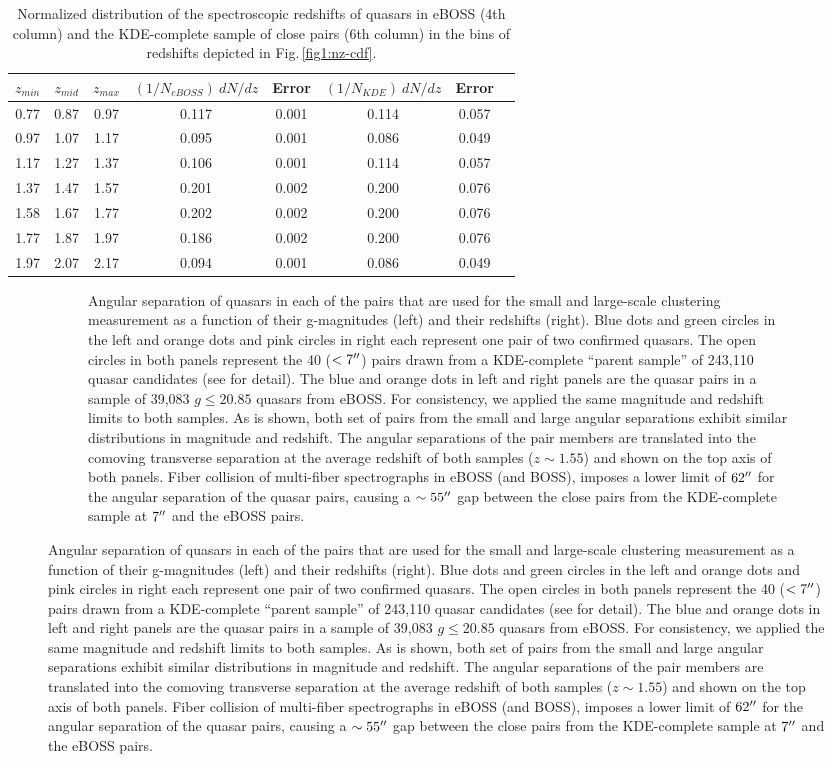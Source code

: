 \documentclass[useAMS,usenatbib]{mn2e}
\begin{document}
\begin{table}
\centering
\begin{tabular}{cccccccc}

\hline
\hline
$z_{min}$   &$z_{mid}$ &$z_{max}$& $(1/N_{eBOSS})~dN/dz$ & Error & $(1/N_{KDE})~dN/dz$& Error\\

\hline


0.77 & 0.87 & 0.97 & 0.117 & 0.001 & 0.114 & 0.057 \\
0.97 & 1.07 & 1.17 & 0.095 & 0.001 & 0.086 & 0.049 \\
1.17 & 1.27 & 1.37 & 0.106 & 0.001 & 0.114 & 0.057 \\
1.37 & 1.47 & 1.57 & 0.201 & 0.002 & 0.200 & 0.076 \\
1.58 & 1.67 & 1.77 & 0.202 & 0.002 & 0.200 & 0.076 \\
1.77 & 1.87 & 1.97 & 0.186 & 0.002 & 0.200 & 0.076 \\
1.97 & 2.07 & 2.17 & 0.094 & 0.001 & 0.086 & 0.049 \\

\hline
\end{tabular}
\caption{ Normalized distribution of the spectroscopic redshifts of quasars in eBOSS (4th column) and the KDE-complete sample of close pairs (6th column) in the bins of redshifts depicted in Fig.\,\ref{fig1:nz-cdf}.}\label{tab:dndz}

\end{table}

\begin{figure}
    \centering
    \begin{subfigure}{
        \centering
        \texttt{[image: gmag\_R\_theta\_eBOSS\_KDE.eps]}
        \texttt{[image: z\_R\_theta\_eBOSS\_KDE.eps]}}
        \caption{Angular separation of quasars in each of the pairs that are 
used for the small and large-scale clustering measurement as a function of their 
g-magnitudes (left) and their redshifts (right). Blue dots and green circles in 
the left and orange dots and pink circles in right each represent one pair of 
two confirmed quasars. The open circles in both panels represent the 40 ($< 7 
\arcsec$) pairs drawn from a KDE-complete ``parent sample'' of  243{,}110 quasar 
candidates (see \citet{ef17} for detail). The blue and orange dots in left and 
right panels are the quasar pairs in a sample of 39{,}083 $g\le 20.85$ quasars 
from eBOSS. For consistency, we applied the same magnitude and redshift limits to both samples. 
As is shown, both set of pairs from the small and large angular separations 
exhibit similar distributions in magnitude and redshift. 
The angular separations of the pair members are translated into the 
comoving transverse separation at the average redshift of both samples ($z\sim 
1.55$) and shown on the top axis of both panels. Fiber collision of multi-fiber 
spectrographs in eBOSS (and BOSS), imposes a lower limit of $62\arcsec$ for the 
angular separation of the quasar pairs, causing a $\sim 55\arcsec$ gap between 
the close pairs from the KDE-complete sample at $7\arcsec$ and the eBOSS 
pairs.}\label{fig2:gz}
    \end{subfigure}
\end{figure}
\end{document}
